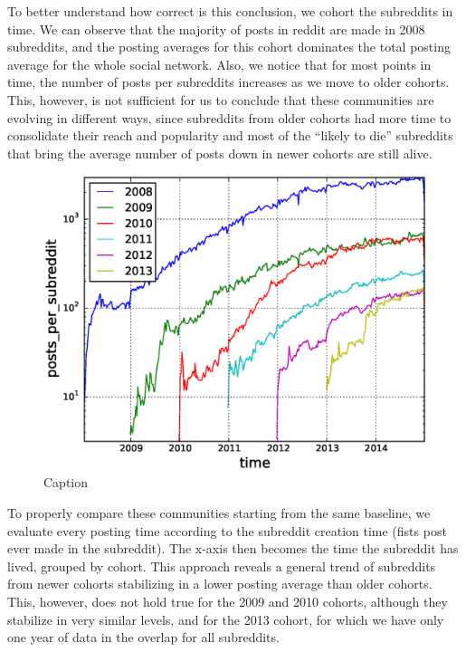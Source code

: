 To better understand how correct is this conclusion, we cohort the subreddits in time. We can observe that the majority of posts in reddit are made in 2008 subreddits, and the posting averages for this cohort dominates the total posting average for the whole social network. Also, we notice that for most points in time, the number of posts per subreddits increases as we move to older cohorts. This, however, is not sufficient for us to conclude that these communities are evolving in different ways, since subreddits from older cohorts had more time to consolidate their reach and popularity and most of the ``likely to die'' subreddits that bring the average number of posts down in newer cohorts are still alive.

\begin{figure}[!tb]
\centering
\includegraphics[scale=0.4]{./images/posts_per_subreddit_over_time_cohorts.eps}
\caption{Caption}
\label{fig:posts_per_subreddit_over_time_cohorts}
\end{figure}

To properly compare these communities starting from the same baseline, we evaluate every posting time according to the subreddit creation time (fists post ever made in the subreddit). The x-axis then becomes the time the subreddit has lived, grouped by cohort. This approach reveals a general trend of subreddits from newer cohorts stabilizing in a lower posting average than older cohorts. This, however, does not hold true for the 2009 and 2010 cohorts, although they stabilize in very similar levels, and for the 2013 cohort, for which we have only one year of data in the overlap for all subreddits.

